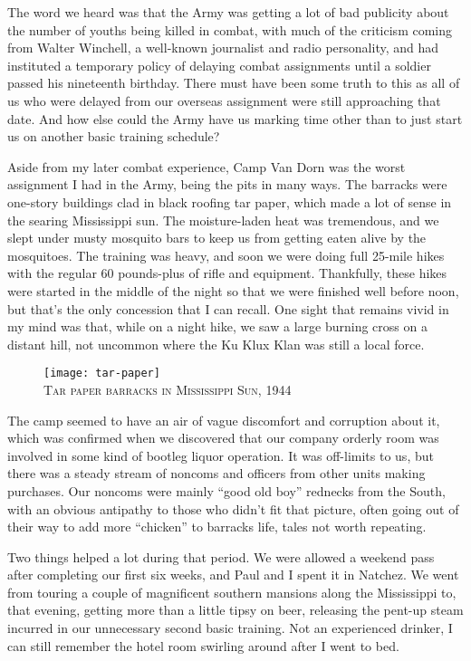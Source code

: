 \documentclass[../m3y]{subfiles}
\begin{document}
The word we heard was that the Army was getting a lot of bad publicity about the number of youths being killed in combat, with much of the criticism coming from Walter Winchell, a well-known journalist and radio personality, and had instituted a temporary policy of delaying combat assignments until a soldier passed his nineteenth birthday. There must have been some truth to this as all of us who were delayed from our overseas assignment were still approaching that date. And how else could the Army have us marking time other than to just start us on another basic training schedule?

Aside from my later combat experience, Camp Van Dorn was the worst assignment I had in the Army, being the pits in many ways. The barracks were one-story buildings clad in black roofing tar paper, which made a lot of sense in the searing Mississippi sun. The moisture-laden heat was tremendous, and we slept under musty mosquito bars to keep us from getting eaten alive by the mosquitoes. The training was heavy, and soon we were doing full 25-mile hikes with the regular 60 pounds-plus of rifle and equipment. Thankfully, these hikes were started in the middle of the night so that we were finished well before noon, but that's the only concession that I can recall. One sight that remains vivid in my mind was that, while on a night hike, we saw a large burning cross on a distant hill, not uncommon where the Ku Klux Klan was still a local force.

\begin{figure}
\centering
\texttt{[image: tar-paper]}\\
\medskip
{\newtimes\textsc{Tar paper barracks in Mississippi Sun, 1944}}
\end{figure}

The camp seemed to have an air of vague discomfort and corruption about it, which was confirmed when we discovered that our company orderly room was involved in some kind of bootleg liquor operation. It was off-limits to us, but there was a steady stream of noncoms and officers from other units making purchases. Our noncoms were mainly ``good old boy'' rednecks from the South, with an obvious antipathy to those who didn't fit that picture, often going out of their way to add more ``chicken'' to barracks life, tales not worth repeating.

Two things helped a lot during that period. We were allowed a weekend pass after completing our first six weeks, and Paul and I spent it in Natchez. We went from touring a couple of magnificent southern mansions along the Mississippi to, that evening, getting more than a little tipsy on beer, releasing the pent-up steam incurred in our unnecessary second basic training. Not an experienced drinker, I can still remember the hotel room swirling around after I went to bed.
\end{document}

